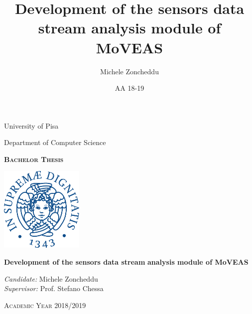 \documentclass[a4paper, 12pt]{report}
\title{Development of the sensors data stream analysis module of MoVEAS}
\author{Michele Zoncheddu}
\date{AA 18-19}
\begin{document}
	\begin{titlepage}
		
		\begin{center}

		{\Large University of Pisa}
		\medskip

		{\Large Department of Computer Science}

		\vspace{20mm}

		{\bfseries \Large \textsc{Bachelor Thesis}}

		\vfill

		\centerline{\mbox{\includegraphics[width=4cm]{img/university_logos/cherubino_unipi.pdf}}}

		\vfill

		{\LARGE \bfseries Development of the sensors data stream}
		\medbreak
		{\LARGE \bfseries analysis module of MoVEAS}

		\vfill
		
		{\large \textit{Candidate:} Michele Zoncheddu}\\
		\vspace{2mm}
		{\large \textit{Supervisor:} Prof. Stefano Chessa}\\

		\vspace{20mm}

		\vfill

		{\large \textsc{Academic Year 2018/2019}}
	\end{center}

	\end{titlepage}


	\tableofcontents
	\clearpage

	\sloppy

	
	\clearpage
	
	\clearpage
	
	\clearpage
	
	\clearpage
	
	\clearpage
	

	\printbibliography[nottype=online, title=Bibliography]
	\printbibliography[type=online, title=Sitography]
\end{document}
